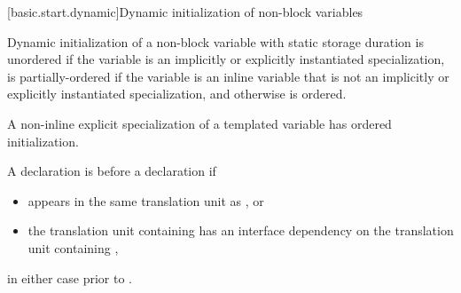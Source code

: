 [basic.start.dynamic]{Dynamic initialization of non-block variables}

\pnum
{}%
%
%
Dynamic initialization of a non-block variable with static storage duration is
unordered if the variable is an implicitly or explicitly instantiated
specialization, is partially-ordered if the variable
is an inline variable that is not an implicitly or explicitly instantiated
specialization, and otherwise is ordered.
\begin{note}
A non-inline explicit specialization of a templated variable
has ordered initialization.
\end{note}

\pnum
A declaration  is
 before a declaration  if
\begin{itemize}
\item {} appears in the same translation unit as , or
\item the translation unit containing 
has an interface dependency
on the translation unit containing ,
\end{itemize}
in either case prior to .

